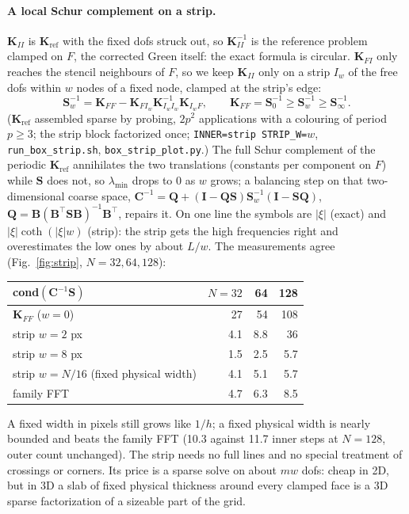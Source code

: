 \documentclass[11pt,a4paper]{article}
\begin{document}
\paragraph{A local Schur complement on a strip.} $\mathbf{K}_{II}$ is $\mathbf{K}_{\mathrm{ref}}$ with the fixed dofs
struck out, so $\mathbf{K}_{II}^{-1}$ is the reference problem clamped on $F$, the corrected Green itself: the exact
formula is circular. $\mathbf{K}_{FI}$ only reaches the stencil neighbours of $F$, so we keep $\mathbf{K}_{II}$ only on a
strip $I_w$ of the free dofs within $w$ nodes of a fixed node, clamped at the strip's edge:
\[
  \mathbf{S}_w^{-1} = \mathbf{K}_{FF} - \mathbf{K}_{FI_w}\mathbf{K}_{I_wI_w}^{-1}\mathbf{K}_{I_wF},
  \qquad \mathbf{K}_{FF} = \mathbf{S}_0^{-1} \ge \mathbf{S}_w^{-1} \ge \mathbf{S}_\infty^{-1}.
\]
($\mathbf{K}_{\mathrm{ref}}$ assembled sparse by probing, $2p^2$ applications with a colouring of period $p \ge 3$; the
strip block factorized once; \texttt{INNER=strip STRIP\_W=}$w$, \texttt{run\_box\_strip.sh}, \texttt{box\_strip\_plot.py}.)
The full Schur complement of the periodic $\mathbf{K}_{\mathrm{ref}}$ annihilates the two translations (constants per
component on $F$) while $\mathbf{S}$ does not, so $\lambda_{\min}$ drops to 0 as $w$ grows; a balancing step on that
two-dimensional coarse space, $\mathbf{C}^{-1} = \mathbf{Q} + (\mathbf{I}-\mathbf{Q}\mathbf{S})\mathbf{S}_w^{-1}
(\mathbf{I}-\mathbf{S}\mathbf{Q})$, $\mathbf{Q} = \mathbf{B}(\mathbf{B}^\top\mathbf{S}\mathbf{B})^{-1}\mathbf{B}^\top$,
repairs it. On one line the symbols are $|\xi|$ (exact) and $|\xi|\coth(|\xi| w)$ (strip): the strip gets the high
frequencies right and overestimates the low ones by about $L/w$. The measurements agree (Fig.~\ref{fig:strip},
$N = 32, 64, 128$):
\begin{center}\small
\begin{tabular}{lrrr}
  \hline
  cond$(\mathbf{C}^{-1}\mathbf{S})$ & $N = 32$ & 64 & 128 \\
  \hline
  $\mathbf{K}_{FF}$ ($w = 0$) & 27 & 54 & 108 \\
  strip $w = 2$ px & 4.1 & 8.8 & 36 \\
  strip $w = 8$ px & 1.5 & 2.5 & 5.7 \\
  strip $w = N/16$ (fixed physical width) & 4.1 & 5.1 & 5.7 \\
  family FFT & 4.7 & 6.3 & 8.5 \\
  \hline
\end{tabular}
\end{center}
A fixed width in pixels still grows like $1/h$; a fixed physical width is nearly bounded and beats the family FFT
(10.3 against 11.7 inner steps at $N = 128$, outer count unchanged). The strip needs no full lines and no special
treatment of crossings or corners. Its price is a sparse solve on about $m w$ dofs: cheap in 2D, but in 3D a slab of
fixed physical thickness around every clamped face is a 3D sparse factorization of a sizeable part of the grid.
\end{document}
